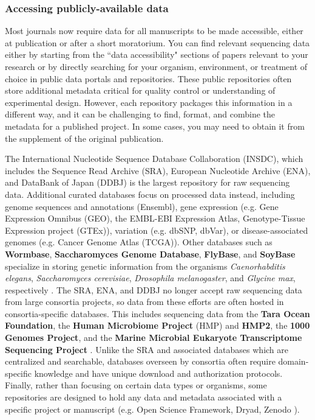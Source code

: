 \documentclass[10pt,letterpaper]{article}
\begin{document}
\subsubsection*{Accessing publicly-available data}

Most journals now require data for all manuscripts to be made accessible, either at publication or after a short moratorium.
You can find relevant sequencing data either by starting from the ``data accessibility" sections of papers relevant to your research or by directly searching for your organism, environment, or treatment of choice in public data portals and repositories. 
These public repositories often store additional metadata critical for quality control or understanding of experimental design. However, each repository packages this information in a different way, and it can be challenging to find, format, and combine the metadata for a published project. In some cases, you may need to obtain it from the supplement of the original publication.

The International Nucleotide Sequence Database Collaboration (INSDC), which includes the Sequence Read Archive (SRA), European Nucleotide Archive (ENA), and DataBank of Japan (DDBJ) is the largest repository for raw sequencing data. 
Additional curated databases focus on processed data instead, including genome sequences and annotations (Ensembl), gene expression (e.g. Gene Expression Omnibus (GEO), the EMBL-EBI Expression Atlas, Genotype-Tissue Expression project (GTEx)), variation (e.g. dbSNP, dbVar), or disease-associated genomes (e.g. Cancer Genome Atlas (TCGA)).
Other databases such as \textbf{Wormbase}, \textbf{Saccharomyces Genome Database}, \textbf{FlyBase}, and \textbf{SoyBase} specialize in storing genetic information from the organisms \textit{Caenorhabditis elegans}, \textit{Saccharomyces cerevisiae}, \textit{Drosophila melanogaster}, and \textit{Glycine max}, respectively \cite{harris2020wormbase, cherry2012saccharomyces, st2014flybase, grant2010soybase}. 
The SRA, ENA, and DDBJ no longer accept raw sequencing data from large consortia projects, so data from these efforts are often hosted in consortia-specific databases. 
This includes sequencing data from the \textbf{Tara Ocean Foundation}, the \textbf{Human Microbiome Project} (HMP) and \textbf{HMP2}, the \textbf{1000 Genomes Project}, and the \textbf{Marine Microbial Eukaryote Transcriptome Sequencing Project} \cite{pesant2015open, turnbaugh2007human, integrative2014integrative, clarke20121000, keeling2014marine}. 
Unlike the SRA and associated databases which are centralized and searchable, databases overseen by consortia often require domain-specific knowledge and have unique download and authorization protocols.
Finally, rather than focusing on certain data types or organisms, some repositories are designed to hold any data and metadata associated with a specific project or manuscript (e.g. Open Science Framework, Dryad, Zenodo \cite{foster2017open}).
\end{document}
